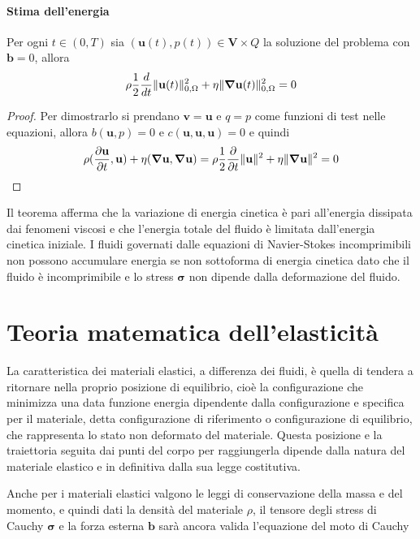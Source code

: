 \paragraph{Stima dell'energia}
\begin{theorem}
Per ogni $t \in (0,T)$ sia $(\mathbf{u}(t),p(t)) \in \mathbf{V} \times Q$ la soluzione del problema con $\mathbf{b}=0$, allora
\begin{equation*}
\rho \frac{1}{2} \frac{d}{dt} \Vert \mathbf{u} (t) \Vert^2_{0,\Omega} + \eta \Vert \boldsymbol{\nabla} \mathbf{u} (t) \Vert^2_{0,\Omega} = 0
\end{equation*}
\end{theorem}
\begin{proof}
Per dimostrarlo si prendano $\mathbf{v}=\mathbf{u}$ e $q=p$ come funzioni di test nelle equazioni, allora $b(\mathbf{u},p)=0$ e $c(\mathbf{u},\mathbf{u},\mathbf{u})=0$ e quindi
\begin{equation*}
\rho\ps{\frac{\partial \mathbf{u}}{\partial t}}{\mathbf{u}}+\eta\ps{\Nabla\mathbf{u}}{\Nabla\mathbf{u}} = 
\rho\frac{1}{2}\frac{\partial} {\partial t}\Vert\mathbf{u}\Vert^2+\eta\Vert \Nabla\mathbf{u}\Vert^2 = 0
\end{equation*}
\end{proof}
Il teorema afferma che la variazione di energia cinetica è pari all'energia dissipata dai fenomeni viscosi e che l'energia totale del fluido è limitata dall'energia cinetica iniziale.
I fluidi governati dalle equazioni di Navier-Stokes incomprimibili non possono accumulare energia se non sottoforma di energia cinetica dato che il fluido è incomprimibile e lo stress $\boldsymbol{\sigma}$ non dipende dalla deformazione del fluido. 

\section{Teoria matematica dell'elasticità}
La caratteristica dei materiali elastici, a differenza dei fluidi, è quella di tendera a ritornare nella proprio posizione di equilibrio, cioè la configurazione che minimizza una data funzione energia dipendente dalla configurazione e specifica per il materiale, detta configurazione di riferimento o configurazione di equilibrio, che rappresenta lo stato non deformato del materiale. Questa posizione e la traiettoria seguita dai punti del corpo per raggiungerla dipende dalla natura del materiale elastico e in definitiva dalla sua legge costitutiva.

Anche per i materiali elastici valgono le leggi di conservazione della massa e del momento, e quindi dati la densità del materiale $\rho$, il tensore degli stress di Cauchy $\boldsymbol{\sigma}$ e la forza esterna $\mathbf{b}$ sarà ancora valida l'equazione del moto di Cauchy

